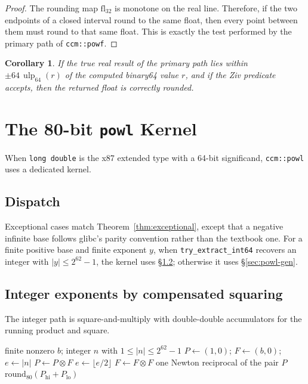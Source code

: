 \documentclass[11pt]{article}
\theoremstyle{plain}
\newtheorem{corollary}{Corollary}
\theoremstyle{remark}
\newcommand{\ulp}{\operatorname{ulp}}
\newcommand{\Powf}{\texttt{ccm::powf}}
\newcommand{\Powl}{\texttt{ccm::powl}}
\begin{document}
\begin{proof}
The rounding map $\mathrm{fl}_{32}$ is monotone on the real line.  Therefore,
if the two endpoints of a closed interval round to the same float, then every
point between them must round to that same float.  This is exactly the test
performed by the primary path of \Powf.
\end{proof}

\begin{corollary}
If the true real result of the primary path lies within
$\pm 64\,\ulp_{64}(r)$ of the computed binary64 value $r$, and if the Ziv
predicate accepts, then the returned float is correctly rounded.
\end{corollary}

\section{The 80-bit \texttt{powl} Kernel}
\label{sec:powl80}

When \texttt{long double} is the x87 extended type with a 64-bit significand,
\Powl{} uses a dedicated kernel.

\subsection{Dispatch}

Exceptional cases match Theorem~\ref{thm:exceptional}, except that a negative
infinite base follows glibc's parity convention rather than the textbook one.
For a finite positive base and finite exponent $y$, when
\texttt{try\_extract\_int64} recovers an integer with $|y| \le 2^{62}-1$, the
kernel uses \S\ref{sec:powl-int}; otherwise it uses \S\ref{sec:powl-gen}.

\subsection{Integer exponents by compensated squaring}
\label{sec:powl-int}

The integer path is square-and-multiply with double-double accumulators for the
running product and square.

\begin{algorithm}
\caption{80-bit integer power $b^{n}$}
\label{alg:powl-int}
\begin{algorithmic}[1]
\Require finite nonzero $b$; integer $n$ with $1 \le |n| \le 2^{62}-1$
\State $P \gets (1,0)$; \quad $F \gets (b,0)$; \quad $e \gets |n|$
   $P \gets P \otimes F$ \EndIf
  \State $e \gets \lfloor e/2 \rfloor$
   $F \gets F \otimes F$ \EndIf
\EndWhile
{} \Return one Newton reciprocal of the pair $P$
\Else{} \Return $\mathrm{round}_{80}(P_{\mathrm{hi}} + P_{\mathrm{lo}})$
\EndIf
\end{algorithmic}
\end{algorithm}
\end{document}
